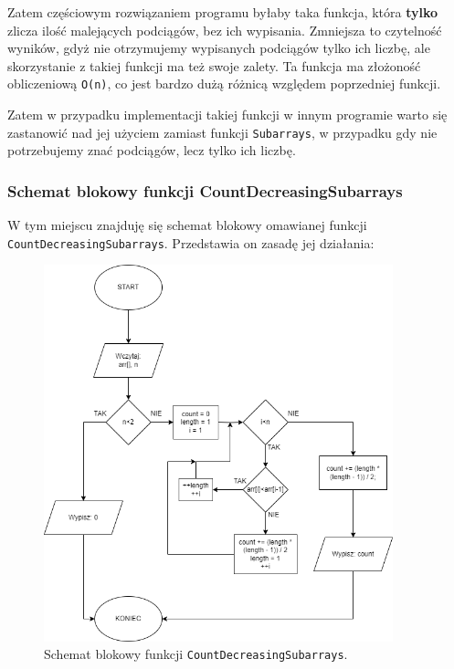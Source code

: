 \documentclass[a4paper,12pt]{article}
\begin{document}
Zatem częściowym rozwiązaniem programu byłaby taka funkcja, która \textbf{tylko} zlicza ilość malejących podciągów, bez ich wypisania. Zmniejsza to czytelność wyników, gdyż nie otrzymujemy wypisanych podciągów tylko ich liczbę, ale skorzystanie z takiej funkcji ma też swoje zalety. Ta funkcja ma złożoność obliczeniową \texttt{O(n)}, co jest bardzo dużą różnicą względem poprzedniej funkcji.

Zatem w przypadku implementacji takiej funkcji w innym programie warto się zastanowić nad jej użyciem zamiast funkcji \texttt{Subarrays}, w przypadku gdy nie potrzebujemy znać podciągów, lecz tylko ich liczbę.

\newpage

\subsubsection{Schemat blokowy funkcji CountDecreasingSubarrays}
W tym miejscu znajduję się schemat blokowy omawianej funkcji \texttt{CountDecreasingSubarrays}. Przedstawia on zasadę jej działania:

\begin{figure}[H]
    \centering
    \includegraphics[width=0.9\textwidth]{Schemat2r.png}
    \caption{Schemat blokowy funkcji \texttt{CountDecreasingSubarrays}.}
    \label{fig:schemat_CountDecreasingSubarrays1}
\end{figure}
\end{document}
